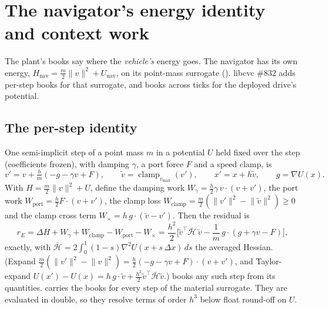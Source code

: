 \documentclass[11pt]{article}
\theoremstyle{remark}
\newcommand{\T}{^{\top}}
\begin{document}
\section{The navigator's energy identity and context work}
\label{sec:nav}

The plant's books say where the \emph{vehicle's} energy goes. The navigator has its own energy,
$H_{\mathrm{nav}}=\tfrac m2\lVert v\rVert^2+U_{\mathrm{nav}}$, on its point-mass surrogate
(). libcvc \#832 adds per-step books for that surrogate, and
books across ticks for the deployed drive's potential.

\subsection{The per-step identity}
One semi-implicit step of a point mass $m$ in a potential $U$ held fixed over the step
(coefficients frozen), with damping $\gamma$, a port force $F$ and a speed clamp, is
\begin{equation}
  v'=v+\tfrac hm(-g-\gamma v+F),\qquad \tilde v=\operatorname{clamp}_{v_{\max}}(v'),\qquad
  x'=x+h\tilde v,\qquad g=\nabla U(x).
  \label{eq:si-step}
\end{equation}
With $H=\tfrac m2\lVert v\rVert^2+U$, define the damping work
$W_\gamma=\tfrac h2\gamma\,v\cdot(v+v')$, the port work $W_{\mathrm{port}}=\tfrac h2F\cdot(v+v')$, the
clamp loss $W_{\mathrm{clamp}}=\tfrac m2(\lVert v'\rVert^2-\lVert\tilde v\rVert^2)\ge0$ and the
clamp cross term $W_\times=h\,g\cdot(\tilde v-v')$. Then the residual is
\begin{equation}
  r_E=\Delta H+W_\gamma+W_{\mathrm{clamp}}-W_{\mathrm{port}}-W_\times
  =\frac{h^2}{2}\Big[\tilde v\T\bar{\mathcal H}\,\tilde v-\frac1m\,g\cdot(g+\gamma v-F)\Big],
  \label{eq:rE}
\end{equation}
exactly, with $\bar{\mathcal H}=2\int_0^1(1-s)\nabla^2U(x+s\,\Delta x)\,ds$ the averaged Hessian.
(Expand $\tfrac m2(\lVert v'\rVert^2-\lVert v\rVert^2)=\tfrac h2(-g-\gamma v+F)\cdot(v+v')$, and
Taylor-expand $U(x')-U(x)=h\,g\cdot\tilde v+\tfrac{h^2}2\tilde v\T\bar{\mathcal H}\tilde v$.)
 books any such step from its quantities.  carries the books
for every step of the material surrogate. They are evaluated in double, so they resolve terms
of order $h^3$ below float round-off on $U$.
\end{document}
